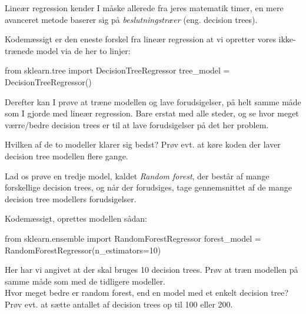\documentclass{ucph-handout}
\begin{document}
\begin{exercisebox}[adjusted title=Sammenlign med Decision tree regræssionsmodel]
Lineær regression kender I måske allerede fra jeres matematik timer, en mere avanceret metode baserer sig på \textit{beslutningstræer} (eng. decision trees).\newline

Kodemæssigt er den eneste forskel fra lineær regression  at vi opretter vores ikke-trænede model via de her to linjer:
\begin{python}
from sklearn.tree import DecisionTreeRegressor
tree_model = DecisionTreeRegressor()
\end{python}

Derefter kan I prøve at træne  modellen og lave forudsigelser, på helt samme måde som I gjorde med lineær regression. Bare erstat  med  alle steder, og se hvor meget værre/bedre decision trees er til at lave forudsigelser på det her problem.\newline

Hvilken af de to modeller klarer sig bedst?\newline
Prøv evt. at køre koden der laver decision tree modellen flere gange.




\end{exercisebox}
\begin{exercisebox}[adjusted title=Random forest - endnu en machine learning model]

Lad os prøve en tredje model, kaldet \textit{Random forest}, der består af mange forskellige decision trees, og når der forudsiges, tage gennemsnittet af de mange decision tree modellers forudsigelser.

Kodemæssigt, oprettes modellen sådan:
\begin{python}
from sklearn.ensemble import RandomForestRegressor
forest_model = RandomForestRegressor(n_estimators=10)
\end{python}

Her har vi angivet at der skal bruges 10 decision trees. Prøv at træn modellen på samme måde som med de tidligere modeller.\\

Hvor meget bedre er random forest, end en model med et enkelt decision tree? Prøv evt. at sætte antallet af decision trees op til 100 eller 200.\\


\end{exercisebox}
\end{document}
